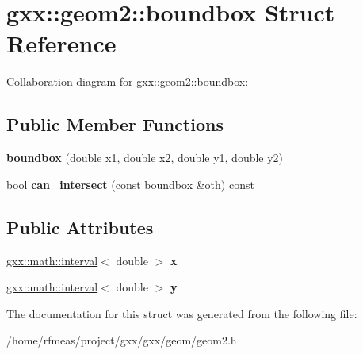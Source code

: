 \hypertarget{structgxx_1_1geom2_1_1boundbox}{}\section{gxx\+:\+:geom2\+:\+:boundbox Struct Reference}
\label{structgxx_1_1geom2_1_1boundbox}


Collaboration diagram for gxx\+:\+:geom2\+:\+:boundbox\+:
\subsection*{Public Member Functions}
\begin{DoxyCompactItemize}
\item 
{\bfseries boundbox} (double x1, double x2, double y1, double y2)\hypertarget{structgxx_1_1geom2_1_1boundbox_a557ce252a0c79cd3fcdd6bfdc8083eb6}{}\label{structgxx_1_1geom2_1_1boundbox_a557ce252a0c79cd3fcdd6bfdc8083eb6}

\item 
bool {\bfseries can\+\_\+intersect} (const \hyperlink{structgxx_1_1geom2_1_1boundbox}{boundbox} \&oth) const \hypertarget{structgxx_1_1geom2_1_1boundbox_a89aa04b662e689b2ca5c1ebbeb4267ac}{}\label{structgxx_1_1geom2_1_1boundbox_a89aa04b662e689b2ca5c1ebbeb4267ac}

\end{DoxyCompactItemize}
\subsection*{Public Attributes}
\begin{DoxyCompactItemize}
\item 
\hyperlink{classgxx_1_1math_1_1interval}{gxx\+::math\+::interval}$<$ double $>$ {\bfseries x}\hypertarget{structgxx_1_1geom2_1_1boundbox_ae431a779a4fd01ea6f154287b242e01c}{}\label{structgxx_1_1geom2_1_1boundbox_ae431a779a4fd01ea6f154287b242e01c}

\item 
\hyperlink{classgxx_1_1math_1_1interval}{gxx\+::math\+::interval}$<$ double $>$ {\bfseries y}\hypertarget{structgxx_1_1geom2_1_1boundbox_a260fb71bc68508e5148b32b196e656dc}{}\label{structgxx_1_1geom2_1_1boundbox_a260fb71bc68508e5148b32b196e656dc}

\end{DoxyCompactItemize}


The documentation for this struct was generated from the following file\+:\begin{DoxyCompactItemize}
\item 
/home/rfmeas/project/gxx/gxx/geom/geom2.\+h\end{DoxyCompactItemize}
